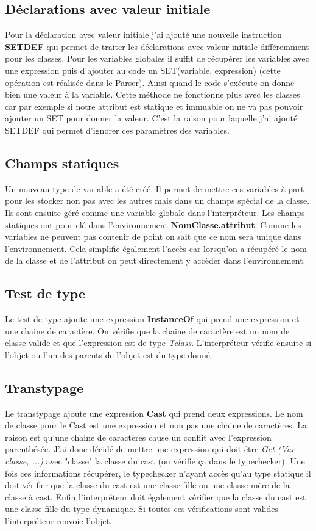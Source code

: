 \documentclass{article}
\begin{document}
\subsection{Déclarations avec valeur initiale}
Pour la déclaration avec valeur initiale j'ai ajouté une nouvelle instruction \textbf{SETDEF} qui permet de traiter les déclarations 
avec valeur initiale différemment pour les classes. Pour les variables globales il suffit de récupérer les variables 
avec une expression puis d'ajouter au code un SET(variable, expression) (cette opération est réalisée dans le Parser). 
Ainsi quand le code s'exécute on donne bien une valeur à la variable. Cette méthode ne fonctionne plus avec les classes 
car par exemple si notre attribut est statique et immuable on ne va pas pouvoir ajouter un SET pour donner la valeur.
C'est la raison pour laquelle j'ai ajouté SETDEF qui permet d'ignorer ces paramètres des variables.

\subsection{Champs statiques}
Un nouveau type de variable a été créé. Il permet de mettre ces variables à part pour les stocker non pas avec les 
autres mais dans un champs spécial de la classe. Ils sont ensuite géré comme une variable globale dans l'interpréteur.
Les champs statiques ont pour clé dans l'environnement \textbf{NomClasse.attribut}. Comme les variables ne peuvent 
pas contenir de point on sait que ce nom sera unique dans l'environnement. Cela simplifie également l'accès car 
lorsqu'on a récupéré le nom de la classe et de l'attribut on peut directement y accèder dans l'environnement.

\subsection{Test de type}
Le test de type ajoute une expression \textbf{InstanceOf} qui prend une expression et une chaine de caractère. On vérifie que la chaine 
de caractère est un nom de classe valide et que l'expression est de type \textit{Tclass}. L'interpréteur vérifie ensuite si l'objet 
ou l'un des parents de l'objet est du type donné.

\subsection{Transtypage}
Le transtypage ajoute une expression \textbf{Cast} qui prend deux expressions. Le nom de classe pour le Cast est une expression et 
non pas une chaine de caractères. La raison est qu'une chaine de caractères cause un conflit avec l'expression parenthésée. J'ai 
donc décidé de mettre une expression qui doit être \textit{Get (Var classe, ...)} avec "classe" la classe du cast (on vérifie 
ça dans le typechecker).
Une fois ces informations récupérer, le typechecker n'ayant accès qu'au type statique il doit vérifier que la classe du cast 
est une classe fille ou une classe mère de la classe à cast. Enfin l'interpréteur doit également vérifier que la classe du 
cast est une classe fille du type dynamique. Si toutes ces vérifications sont valides l'interpréteur renvoie l'objet.
\end{document}
